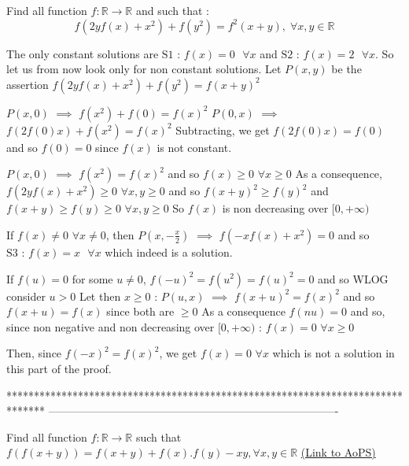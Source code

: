 \begin{solution}
	\begin{tcolorbox}Find all function $f:\mathbb{R}\rightarrow \mathbb{R}$ and such that :
\[f(2yf(x)+x^2)+f(y^2)=f^2(x+y),\;\forall x,y\in \mathbb{R}\]\end{tcolorbox}
The only constant solutions are $\boxed{\text{S1 : }f(x)=0\text{  }\forall x}$ and $\boxed{\text{S2 : }f(x)=2\text{  }\forall x}$.
So let us from now look only for non constant solutions.
Let $P(x,y)$ be the assertion $f(2yf(x)+x^2)+f(y^2)=f(x+y)^2$

$P(x,0)$ $\implies$ $f(x^2)+f(0)=f(x)^2$
$P(0,x)$ $\implies$ $f(2f(0)x)+f(x^2)=f(x)^2$
Subtracting, we get $f(2f(0)x)=f(0)$ and so $f(0)=0$ since $f(x)$ is not constant.

$P(x,0)$ $\implies$ $f(x^2)=f(x)^2$ and so $f(x)\ge 0$ $\forall x\ge 0$
As a consequence, $f(2yf(x)+x^2)\ge 0$ $\forall x,y\ge 0$ and so $f(x+y)^2\ge f(y)^2$ and $f(x+y)\ge f(y)\ge 0$ $\forall x,y\ge 0$
So $f(x)$ is non decreasing over $[0,+\infty)$

If $f(x)\ne 0$ $\forall x\ne 0$, then $P(x,-\frac x2)$ $\implies$ $f(-xf(x)+x^2)=0$ and so $\boxed{\text{S3 : }f(x)=x\text{  }\forall x}$ which indeed is a solution.

If $f(u)=0$ for some $u\ne 0$, $f(-u)^2=f(u^2)=f(u)^2=0$ and so WLOG consider $u>0$
Let then $x\ge 0$ : $P(u,x)$ $\implies$ $f(x+u)^2=f(x)^2$ and so $f(x+u)=f(x)$ since both are $\ge 0$
As a consequence $f(nu)=0$ and so, since non negative and non decreasing over $[0,+\infty)$ : $f(x)=0$ $\forall x\ge 0$

Then, since $f(-x)^2=f(x)^2$, we get $f(x)=0$ $\forall x$ which is not a solution in this part of the proof.
\end{solution}
*******************************************************************************
-------------------------------------------------------------------------------

\begin{problem}
	Find all function $f : \mathbb{R} \to \mathbb{R}$ such that 
$f\left ( f\left ( x+y \right ) \right )=f\left ( x+y \right )+f(x).f(y)-xy  ,\forall x,y\in \mathbb{R}$
	\flushright \href{https://artofproblemsolving.com/community/c6h618319}{(Link to AoPS)}
\end{problem}



